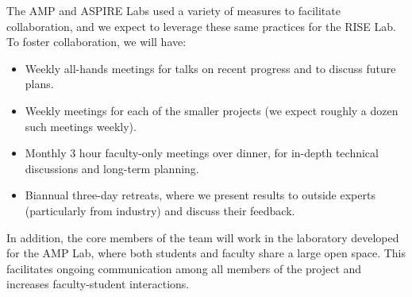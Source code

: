 The AMP and ASPIRE Labs used a variety of measures to facilitate collaboration, and we expect to leverage these same practices for the RISE Lab.   To foster collaboration, we will have:

\begin{itemize}[noitemsep,topsep=0pt,parsep=0pt,partopsep=0pt]
\item Weekly all-hands meetings for talks on recent progress and to discuss future plans.
\item  Weekly meetings for each of the smaller projects (we expect roughly a dozen such meetings weekly).
\item  Monthly 3 hour faculty-only meetings over dinner, for in-depth technical discussions and long-term planning.
\item  Biannual three-day retreats, where we present results to outside experts (particularly from industry) and discuss their feedback.
\end{itemize}

In addition, the core members of the team will work in the laboratory developed for the AMP Lab, where both students and faculty share a large open space.  This facilitates ongoing communication among all members of the project and increases faculty-student interactions.


